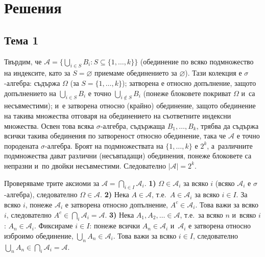 \chapter*{Решения}

\section*{Тема 1}

\begin{proofbox}
Твърдим, че $\mathcal A = \big\{\bigcup_{i\in S} B_i : S\subseteq
\{1,\dots,k\}\big\}$ (обединение по всяко подмножество на индексите,
като за $S=\varnothing$ приемаме обединението за $\varnothing$).
Тази колекция е $\sigma$-алгебра: съдържа $\Omega$ (за $S=\{1,\dots,
k\}$); затворена е относно допълнение, защото допълнението на
$\bigcup_{i\in S}B_i$ е точно $\bigcup_{i\notin S}B_i$ (понеже
блоковете покриват $\Omega$ и~са несъвместими); и~е затворена относно
(крайно) обединение, защото обединение на такива множества отговаря
на обединението на съответните индексни множества. Освен това всяка
$\sigma$-алгебра, съдържаща $B_1,\dots,B_k$, трябва да съдържа всички
такива обединения по затвореност относно обединение, така че
$\mathcal A$ е точно породената $\sigma$-алгебра. Броят на
подмножествата на $\{1,\dots,k\}$ е $2^k$, а~различните подмножества
дават различни (несъвпадащи) обединения, понеже блоковете са
непразни и~по двойки несъвместими. Следователно $|\mathcal A|=2^k$.
\end{proofbox}

\begin{proofbox}
Проверяваме трите аксиоми за $\mathcal A=\bigcap_{i\in I}\mathcal
A_i$. \textbf{1)} $\Omega\in\mathcal A_i$ за всяко $i$ (всяко
$\mathcal A_i$ е $\sigma$-алгебра), следователно $\Omega\in\mathcal
A$. \textbf{2)} Нека $A\in\mathcal A$, т.е.\ $A\in\mathcal A_i$ за
всяко $i\in I$. За всяко $i$, понеже $\mathcal A_i$ е затворена
относно допълнение, $A^c\in\mathcal A_i$. Това важи за всяко $i$,
следователно $A^c\in\bigcap_i\mathcal A_i=\mathcal A$. \textbf{3)}
Нека $A_1,A_2,\dots\in\mathcal A$, т.е.\ за всяко $n$ и~всяко $i$:
$A_n\in\mathcal A_i$. Фиксираме $i\in I$: понеже всички $A_n\in
\mathcal A_i$ и~$\mathcal A_i$ е затворена относно изброимо
обединение, $\bigcup_n A_n\in\mathcal A_i$. Това важи за всяко
$i\in I$, следователно $\bigcup_n A_n\in\bigcap_i\mathcal A_i=
\mathcal A$. \qedbg
\end{proofbox}

